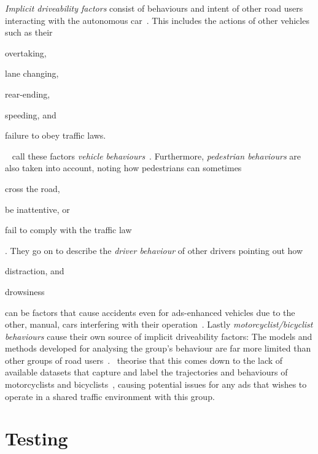 \emph{Implicit driveability factors} consist of behaviours and intent of other road users
interacting with the autonomous car~\cite[3138]{safeToDrive}. This includes the actions of other
vehicles such as their \begin{inparaenum}
    \item overtaking,
    \item lane changing,
    \item rear-ending,
    \item speeding, and
    \item failure to obey traffic laws.\end{inparaenum}~\citeauthor{safeToDrive} call these factors
\emph{vehicle behaviours}~\cite[3138]{safeToDrive}. Furthermore, \emph{pedestrian behaviours}
are also taken into account, noting how pedestrians can sometimes
\begin{inparaenum}\setcounter{enumi}{5}
    \item cross the road,
    \item be inattentive, or
    \item fail to comply with the traffic law \end{inparaenum}\cite[3138]{safeToDrive}. They go on
to describe the \emph{driver behaviour} of other drivers pointing out how
\begin{inparaenum}\setcounter{enumi}{8}
    \item distraction, and
    \item drowsiness \end{inparaenum} can be factors that cause accidents even for
\acrshort{ads}-enhanced vehicles due to the other, manual, cars
interfering with their operation~\cite[3138-3139]{safeToDrive}. Lastly
\emph{motorcyclist/bicyclist behaviours} cause their own source of implicit driveability factors:
The models and methods developed for analysing the group's behaviour are far more limited than other
groups of road users~\cite[3139]{safeToDrive}.~\citeauthor{safeToDrive} theorise that this comes
down to the lack of available datasets that capture and label the trajectories and behaviours
of motorcyclists and bicyclists~\cite[3139]{safeToDrive}, causing potential issues for any
\acrshort{ads} that wishes to operate in a shared traffic environment with this
group.

\section{Testing}\label{sec:testing}

